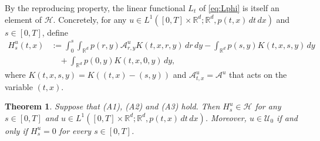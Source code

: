 \documentclass[11pt,leqno]{article}
\theoremstyle{plain}
\newtheorem{thm}{Theorem}
\theoremstyle{remark}
\theoremstyle{definition}
\numberwithin{equation}{section}
\numberwithin{figure}{section}
\numberwithin{table}{section}
\begin{document}
By the reproducing property, the linear functional $L_t$ of
\eqref{eq:Lphi} is itself an element of $\mathcal{H}$.  Concretely,
for any $u\in L^1([0,T]\times\mathbb{R}^d;\mathbb{R}^d,p(t,x)\,dt\,dx)$
and $s\in[0,T]$, define
\begin{align*}
 H_s^u(t,x)&:= \int_0^s \int_{\mathbb{R}^d}p(r,y)\mathcal{A}^u_{r,y}K(t,x, r,y)\,dr\,dy
  - \int_{\mathbb{R}^d}p(s,y)K(t,x, s,y)\,dy \\
 &\quad + \int_{\mathbb{R}^d}p(0,y)K(t,x, 0,y)\,dy,
\end{align*}
where $K(t,x,s,y)=K((t,x) - (s,y))$ and $\mathcal{A}^u_{t,x}=\mathcal{A}^u$ that acts on the variable $(t,x)$.
\begin{thm}\label{thm:Ht-in-H}
Suppose that {\rm (A1)}, {\rm (A2)} and {\rm (A3)} hold. Then
$H_s^u\in\mathcal{H}$ for any $s\in [0,T]$ and
$u\in L^1([0,T]\times\mathbb{R}^d;\mathbb{R}^d, p(t,x)\,dt\,dx)$.
Moreover, $u\in\mathcal{U}_0$ if and only if $H_s^u=0$ for every
$s\in [0,T]$.
\end{thm}
\end{document}
